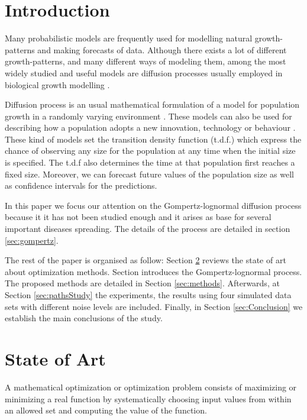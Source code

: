 \documentclass{sig-alternate}
\begin{document}
\section{Introduction}

Many probabilistic models are frequently used for modelling natural
growth-patterns and making forecasts of data.%
Although there exists a lot of
different growth-patterns, and many different ways of modeling them,
among the most widely
studied and useful models are diffusion processes \cite{rogerswilliams1} %
usually employed in biological growth modelling \cite{Kaandorp:400332}. 

Diffusion process is an usual mathematical formulation of a model for population growth in a randomly
varying environment \cite{lognormal}. %
 These models can also be used for describing how a population adopts a new innovation, technology or behaviour \cite{Myrskyla2013}. These kind of models set the transition density function (t.d.f.) which express the chance of observing
any size for the population at any time when the initial size is specified. The t.d.f also determines the time at that population first reaches a fixed size. Moreover, we can forecast future values of the population size as well as confidence intervals for the predictions.

In this paper we focus our attention on the Gompertz-lognormal \cite{eurocast2013} diffusion process because it it has not been studied enough and it arises as base for several important diseases spreading. The details of the process are detailed in section \ref{sec:gompertz}. 

The rest of the paper is organised as follow: Section \ref{sec:soa} reviews the state of art about optimization methods. Section \label{sec:gompertz}  introduces the Gompertz-lognormal process. The proposed methods are detailed in Section \ref{sec:methods}. Afterwards, at Section \ref{sec:pathsStudy} the experiments, the results using four simulated data sets with different noise levels are included. Finally, in Section \ref{sec:Conclusion} we establish the main conclusions of the study.


\section{State of Art}
\label{sec:soa}



A mathematical optimization or optimization problem \cite{Minoux1986}
consists of maximizing or minimizing a real function by systematically
choosing input values from within an allowed set and computing the
value of the function.  %
\end{document}
